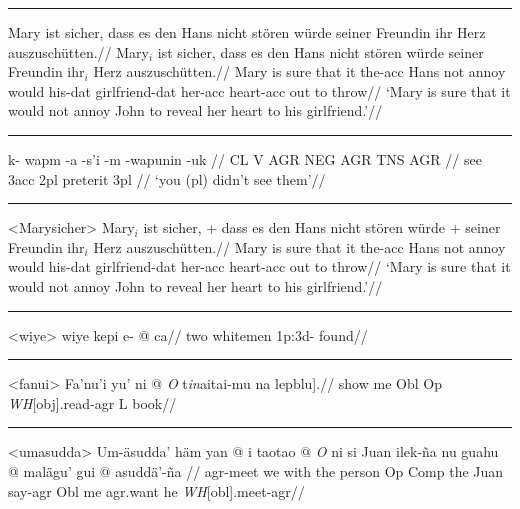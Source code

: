\filbreak\hrule\medskip

\begingroup
\ex
\hsize=4in
\begingl
\glpreamble Mary ist sicher, dass es den Hans nicht st\"oren w\"urde
seiner Freundin ihr Herz auszusch\"utten.//
\gla Mary$_i$ ist sicher, dass es den Hans nicht st\"oren w\"urde
seiner Freundin ihr$_i$ Herz auszusch\"utten.//
\glb Mary is sure that it the-{\sc acc} Hans not annoy would
his-{\sc dat} girlfriend-{\sc dat} her-{\sc acc} heart-{\sc acc} {out to
throw}//
\glft  `Mary is sure that it would not annoy John to reveal her
heart to his girlfriend.'//
\endgl
\xe
\endgroup
\bigskip

\filbreak\hrule\medskip

\begingroup
{}
\begingl
\gla k- wapm -a -s'i -m -wapunin -uk //
\glb CL V AGR NEG AGR TNS AGR //
 see {\sc 3acc} {} {\sc 2pl} preterit {\sc 3pl} //
\glft `you (pl) didn't see them'//
\endgl
\xe
\endgroup
\bigskip

\filbreak\hrule\medskip

\begingroup
\ex<Marysicher>
\begingl
\gla Mary$_i$ ist sicher, + dass es den Hans nicht st\"oren w\"urde
+ seiner Freundin ihr$_i$ Herz auszusch\"utten.//
\glb Mary is sure that it the-{\sc acc} Hans not annoy would
his-{\sc dat} girlfriend-{\sc dat} her-{\sc acc} heart-{\sc acc} {out to
throw}//
\glft  `Mary is sure that it would not annoy John to reveal her
heart to his girlfriend.'//
\endgl
\xe
\endgroup
\bigskip

\filbreak\hrule\medskip

\begingroup
\ex<wiye>
\begingl
\gla wiye kepi e- @ ca//
\glb two whitemen {\sc 1p:3d}- found//
\endgl
\xe
\endgroup
\bigskip

\filbreak\hrule\medskip

\begingroup
\ex[everygla=,glhangstyle=normal]<fanui>
\begingl
\gla Fa'nu'i yu' ni \nogloss{[[} @ {\it O} t{\it in\/}aitai-mu
\nogloss{{\it t\/}]} na {lepblu].}//
\glb show me Obl Op {\it WH\/}[obj].read-agr L book//
\endgl
\xe
\endgroup
\bigskip

\filbreak\hrule\medskip

\begingroup
\ex[everygla=,glhangstyle=normal]<umasudda>
\begingl
\gla Um-\"asudda' h\"am yan \nogloss{$[\,$} @ i taotao \nogloss{$[\,$} @
{\it O\/} ni si Juan ilek-\~na nu guahu \nogloss{$[\,$} @ mal\"agu' gui
\nogloss{$[\,$} @
asudd\"a'-\~na \nogloss{{\it t\/}$\,]]]]$.}//
\glb agr-meet we with the person Op Comp the Juan say-agr Obl me
agr.want he {\it WH\/}[obl].meet-agr//
\endgl
\xe
\endgroup
\bigskip

